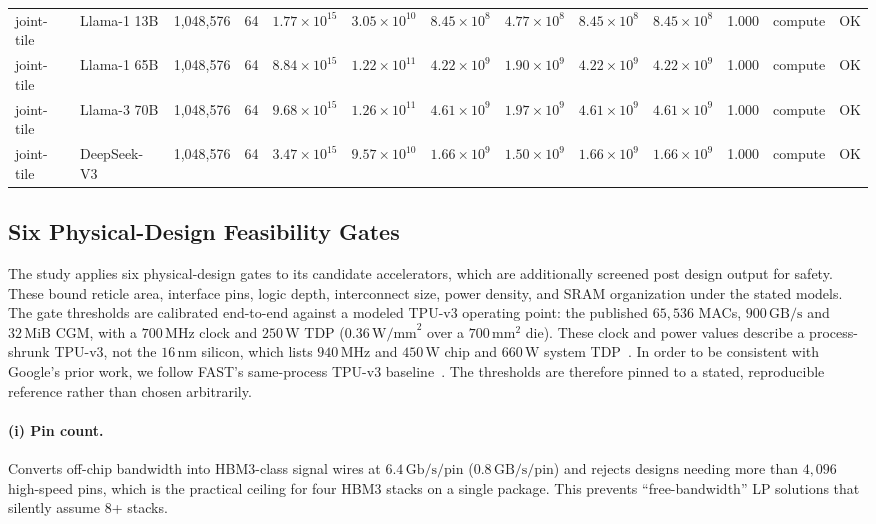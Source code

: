 \begin{table}[ht!]
{\begin{tabular}{llrrrrrrrrrll}
joint-tile & Llama-1 13B & 1{,}048{,}576 &  64 & $1.77\times10^{15}$ & $3.05\times10^{10}$ & $8.45\times10^{8}$ & $4.77\times10^{8}$ & $8.45\times10^{8}$ & $8.45\times10^{8}$ & 1.000 & compute & OK \\
joint-tile & Llama-1 65B & 1{,}048{,}576 &  64 & $8.84\times10^{15}$ & $1.22\times10^{11}$ & $4.22\times10^{9}$ & $1.90\times10^{9}$ & $4.22\times10^{9}$ & $4.22\times10^{9}$ & 1.000 & compute & OK \\
joint-tile & Llama-3 70B & 1{,}048{,}576 &  64 & $9.68\times10^{15}$ & $1.26\times10^{11}$ & $4.61\times10^{9}$ & $1.97\times10^{9}$ & $4.61\times10^{9}$ & $4.61\times10^{9}$ & 1.000 & compute & OK \\
joint-tile & DeepSeek-V3 & 1{,}048{,}576 &  64 & $3.47\times10^{15}$ & $9.57\times10^{10}$ & $1.66\times10^{9}$ & $1.50\times10^{9}$ & $1.66\times10^{9}$ & $1.66\times10^{9}$ & 1.000 & compute & OK \\
\bottomrule
\end{tabular}%
}
\end{table}


\clearpage
\subsection{Six Physical-Design Feasibility Gates}
\label{app:gates}
The study applies six physical-design gates to its candidate accelerators, which are additionally screened post design output for safety.
These bound reticle area, interface pins, logic depth, interconnect size, power density, and SRAM organization under the stated models.
The gate thresholds are calibrated end-to-end against a modeled TPU-v3 operating point: the published $65{,}536$ MACs, $900\,\mathrm{GB/s}$ and $32\,\mathrm{MiB}$ CGM, with a $700\,\mathrm{MHz}$ clock and $250\,\mathrm{W}$ TDP ($0.36\,\mathrm{W/mm}^2$ over a $700\,\mathrm{mm}^2$ die).
These clock and power values describe a process-shrunk TPU-v3, not the $16$\,nm silicon, which lists $940\,\mathrm{MHz}$ and $450\,\mathrm{W}$ chip and $660\,\mathrm{W}$ system TDP~\citep{jouppi2021ten}.
In order to be consistent with Google's prior work, we follow FAST's same-process TPU-v3 baseline~\citep{zhang_fast}.
The thresholds are therefore pinned to a stated, reproducible reference rather than chosen arbitrarily.

\paragraph{(i) Pin count.}
Converts off-chip bandwidth into HBM3-class signal wires at $6.4\,\mathrm{Gb/s/pin}$ ($0.8\,\mathrm{GB/s/pin}$) and rejects designs needing more than $4{,}096$ high-speed pins, which is the practical ceiling for four HBM3 stacks on a single package.
This prevents ``free-bandwidth'' LP solutions that silently assume 8+ stacks.

